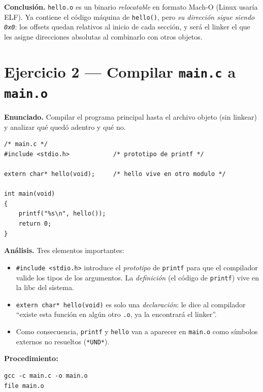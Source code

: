 \documentclass[11pt,a4paper]{article}
\begin{document}
\textbf{Conclusión.} \texttt{hello.o} es un binario \emph{relocatable}
en formato Mach-O (Linux usaría ELF). Ya contiene el código máquina de
\texttt{hello()}, pero \emph{su dirección sigue siendo \texttt{0x0}}:
los offsets quedan relativos al inicio de cada sección, y será el
linker el que les asigne direcciones absolutas al combinarlo con
otros objetos.

\section{Ejercicio 2 --- Compilar \texttt{main.c} a \texttt{main.o}}

\textbf{Enunciado.} Compilar el programa principal hasta el archivo
objeto (sin linkear) y analizar qué quedó adentro y qué no.

\begin{lstlisting}[style=cstyle]
/* main.c */
#include <stdio.h>            /* prototipo de printf */

extern char* hello(void);     /* hello vive en otro modulo */

int main(void)
{
    printf("%s\n", hello());
    return 0;
}
\end{lstlisting}

\textbf{Análisis.} Tres elementos importantes:

\begin{itemize}[leftmargin=*]
    \item \texttt{\#include <stdio.h>} introduce el \emph{prototipo}
        de \texttt{printf} para que el compilador valide los tipos de
        los argumentos. La \emph{definición} (el código de
        \texttt{printf}) vive en la libc del sistema.
    \item \texttt{extern char* hello(void)} es solo una
        \emph{declaración}: le dice al compilador ``existe esta
        función en algún otro \texttt{.o}, ya la encontrará el linker''.
    \item Como consecuencia, \texttt{printf} y \texttt{hello} van a
        aparecer en \texttt{main.o} como símbolos externos no
        resueltos (\texttt{*UND*}).
\end{itemize}

\textbf{Procedimiento:}

\begin{lstlisting}
gcc -c main.c -o main.o
file main.o
\end{lstlisting}
\end{document}
